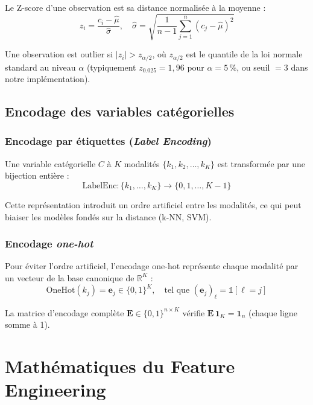 \documentclass[12pt,a4paper]{article}
\begin{document}
Le Z-score d'une observation est sa distance normalisée à la moyenne :
\begin{equation}
  z_i = \frac{c_i - \hat{\mu}}{\hat{\sigma}}, \quad
  \hat{\sigma} = \sqrt{\frac{1}{n-1}\sum_{j=1}^{n}(c_j - \hat{\mu})^2}
\end{equation}

Une observation est outlier si $|z_i| > z_{\alpha/2}$, où $z_{\alpha/2}$ est le
quantile de la loi normale standard au niveau $\alpha$ (typiquement $z_{0.025} = 1{,}96$
pour $\alpha = 5\,\%$, ou seuil $= 3$ dans notre implémentation).

\subsection{Encodage des variables catégorielles}

\subsubsection{Encodage par étiquettes (\textit{Label Encoding})}

Une variable catégorielle $C$ à $K$ modalités $\{k_1, k_2, \ldots, k_K\}$ est
transformée par une bijection entière :
\begin{equation}
  \text{LabelEnc} : \{k_1, \ldots, k_K\} \to \{0, 1, \ldots, K-1\}
\end{equation}

Cette représentation introduit un ordre artificiel entre les modalités, ce qui peut
biaiser les modèles fondés sur la distance (k-NN, SVM).

\subsubsection{Encodage \textit{one-hot}}

Pour éviter l'ordre artificiel, l'encodage one-hot représente chaque modalité par
un vecteur de la base canonique de $\mathbb{R}^K$ :
\begin{equation}
  \text{OneHot}(k_j) = \mathbf{e}_j \in \{0,1\}^K, \quad
  \text{tel que } (\mathbf{e}_j)_\ell = \mathbb{1}[\ell = j]
\end{equation}

La matrice d'encodage complète $\mathbf{E} \in \{0,1\}^{n \times K}$ vérifie
$\mathbf{E}\,\mathbf{1}_K = \mathbf{1}_n$ (chaque ligne somme à 1).

\section{Mathématiques du Feature Engineering}
\end{document}
